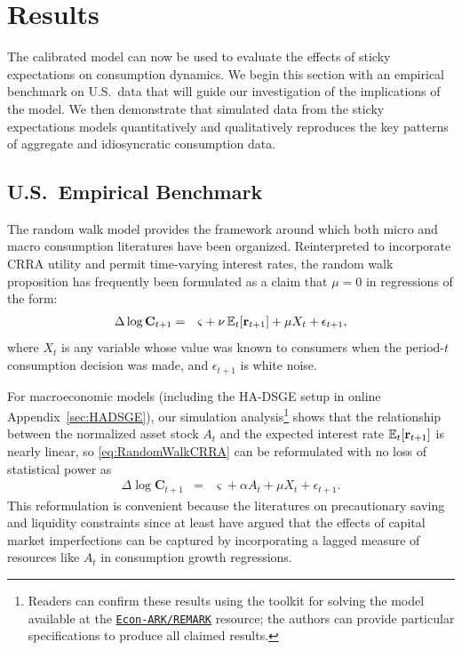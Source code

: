 \documentclass[titlepage]{./econtex}
\begin{document}
\section{Results}\label{sec:Results}

The calibrated model can now be used to evaluate the effects of sticky expectations on consumption dynamics.  We begin this section with an empirical benchmark on U.S.\ data that will guide our investigation of the implications of the model.  We then demonstrate that simulated data from the sticky expectations models quantitatively and qualitatively reproduces the key patterns of aggregate and idiosyncratic consumption data.

\subsection{U.S.\ Empirical Benchmark}
\label{sec:EmpBenchmark}

The random walk model provides the framework around which both micro and macro consumption literatures have been organized.  Reinterpreted to incorporate CRRA utility and permit time-varying interest rates, the random walk proposition has frequently been formulated as a claim that $\mu=0$ in regressions of the form:
\begin{eqnarray}
  \label{eq:RandomWalkCRRA}
  \Delta \log \mathbf{C}_{t+1} & = & \varsigma+\nu \operatorname{\mathbb{E}}_{t}[\mathbf{r}_{t+1}]+\mu X_{t}+\epsilon_{t+1},
\end{eqnarray}
where $X_{t}$ is any variable whose value was known to consumers
when the period-$t$ consumption decision was made, and $\epsilon_{t+1}$
is white noise.

For macroeconomic models (including the HA-DSGE setup in online Appendix~\ref{sec:HADSGE}), our simulation analysis\footnote{Readers can confirm these results using the toolkit for solving the model available at the \href{https://github.com/econ-ark/REMARK/tree/master/REMARKs/cAndCwithStickyE}{\texttt{Econ-ARK/REMARK}} resource; the authors can provide particular specifications to produce all claimed results.}
shows that the relationship between the normalized asset stock $A_{t}$ and the expected interest rate $\operatorname{\mathbb{E}}_{t}[\mathbf{r}_{t+1}]$ is nearly linear, so \eqref{eq:RandomWalkCRRA} can be reformulated with no loss of statistical power as
\begin{eqnarray*}
  \label{eq:RandomWalkAForm}
  \Delta \log \mathbf{C}_{t+1} & = & \varsigma+\alpha A_{t}+\mu X_{t}+\epsilon_{t+1}.
\end{eqnarray*}
This reformulation is convenient because the literatures on precautionary saving and liquidity constraints since at least \cite{zeldes:jpe,zeldesStochastic} have argued that the effects of capital market imperfections can be captured by incorporating a lagged measure of resources like $A_{t}$ in consumption growth regressions.
\end{document}
